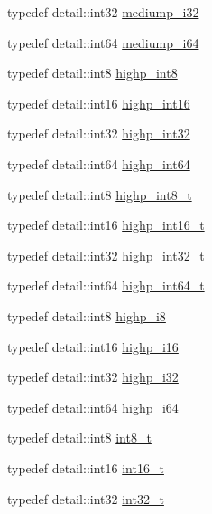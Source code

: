 \begin{CompactItemize}
\item 
typedef detail::int32 \hyperlink{group__gtc__type__precision_g5e00ec824eb55968a6b6496f294d8c07}{mediump\_\-i32}
\item 
typedef detail::int64 \hyperlink{group__gtc__type__precision_g90fedf6c701ffbe00535156715e50787}{mediump\_\-i64}
\item 
typedef detail::int8 \hyperlink{group__gtc__type__precision_g57c86999e666760c304453f9bfdc09d1}{highp\_\-int8}
\item 
typedef detail::int16 \hyperlink{group__gtc__type__precision_gf0430ed80e88c0d1dfbe47f359659c81}{highp\_\-int16}
\item 
typedef detail::int32 \hyperlink{group__gtc__type__precision_ga2045c92b9553d463191af6a20e997bb}{highp\_\-int32}
\item 
typedef detail::int64 \hyperlink{group__gtc__type__precision_g7ffb27943e9569800979081bc548621c}{highp\_\-int64}
\item 
typedef detail::int8 \hyperlink{group__gtc__type__precision_g417701b99e6e7992f35ab2ef694f88b2}{highp\_\-int8\_\-t}
\item 
typedef detail::int16 \hyperlink{group__gtc__type__precision_g07d318d61472e75238e53b9642227672}{highp\_\-int16\_\-t}
\item 
typedef detail::int32 \hyperlink{group__gtc__type__precision_g783d077a513c1f475f6cdb406b4238c3}{highp\_\-int32\_\-t}
\item 
typedef detail::int64 \hyperlink{group__gtc__type__precision_g0f5186bde44471133b08057cae8a51ac}{highp\_\-int64\_\-t}
\item 
typedef detail::int8 \hyperlink{group__gtc__type__precision_g8b9eb0b24cce7f14478bfcacb53ce839}{highp\_\-i8}
\item 
typedef detail::int16 \hyperlink{group__gtc__type__precision_ga04399853952dbce29cb62e2432f350a}{highp\_\-i16}
\item 
typedef detail::int32 \hyperlink{group__gtc__type__precision_g197d19b585222da57d70238a5cfc2be8}{highp\_\-i32}
\item 
typedef detail::int64 \hyperlink{group__gtc__type__precision_gd3cb9a0ac0266ea2c51c6fac256345d1}{highp\_\-i64}
\item 
typedef detail::int8 \hyperlink{group__gtc__type__precision_g673898d450b2a91186f3c4f40c5f8633}{int8\_\-t}
\item 
typedef detail::int16 \hyperlink{group__gtc__type__precision_gf89ee61e0d34aa4a462104b7ae7f2da6}{int16\_\-t}
\item 
typedef detail::int32 \hyperlink{group__gtc__type__precision_gb870c0eb6f525b0c8c4716762e0fc3a8}{int32\_\-t}

\end{CompactItemize}
